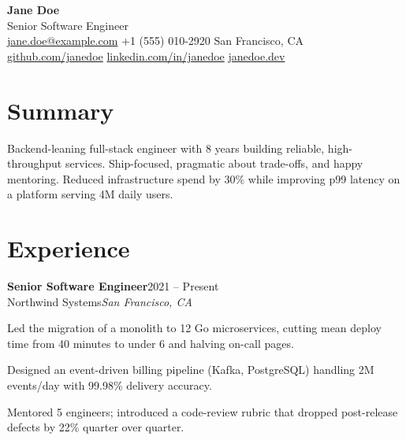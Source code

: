 \documentclass[a4paper,11pt]{article}
\newcommand{\entry}[4]{%
  \par\smallskip
  \noindent\textbf{#1}\hfill{\color{textgrey}\small #2}\\[1pt]
  {\color{accent}\small #3}\hfill{\color{textgrey}\small\itshape #4}\par
}
\begin{document}
{\Huge\bfseries\color{accent} Jane Doe}\\[2pt]
{\large\color{textgrey} Senior Software Engineer}\\[6pt]
{\small
  \href{mailto:jane.doe@example.com}{jane.doe@example.com}
  \quad\textbar\quad +1 (555) 010-2920
  \quad\textbar\quad San Francisco, CA
  \\[2pt]
  \href{https://github.com/janedoe}{github.com/janedoe}
  \quad\textbar\quad
  \href{https://www.linkedin.com/in/janedoe}{linkedin.com/in/janedoe}
  \quad\textbar\quad
  \href{https://janedoe.dev}{janedoe.dev}%
}

\section{Summary}
Backend-leaning full-stack engineer with 8 years building reliable,
high-throughput services. Ship-focused, pragmatic about trade-offs, and happy
mentoring. Reduced infrastructure spend by 30\% while improving p99 latency on
a platform serving 4M daily users.

\section{Experience}

\entry{Senior Software Engineer}{2021 -- Present}{Northwind Systems}{San Francisco, CA}
\begin{points}
  \item Led the migration of a monolith to 12 Go microservices, cutting
        mean deploy time from 40 minutes to under 6 and halving on-call pages.
  \item Designed an event-driven billing pipeline (Kafka, PostgreSQL) handling
        2M events/day with 99.98\% delivery accuracy.
  \item Mentored 5 engineers; introduced a code-review rubric that dropped
        post-release defects by 22\% quarter over quarter.
\end{points}
\end{document}

